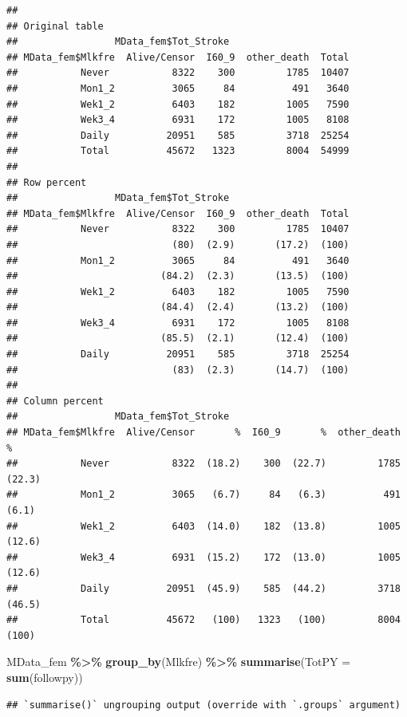 \documentclass[
]{article}
\newenvironment{Shaded}{\begin{snugshade}}{\end{snugshade}}
\newcommand{\DataTypeTok}[1]{\textcolor[rgb]{0.13,0.29,0.53}{#1}}
\newcommand{\KeywordTok}[1]{\textcolor[rgb]{0.13,0.29,0.53}{\textbf{#1}}}
\newcommand{\NormalTok}[1]{#1}
\newcommand{\OperatorTok}[1]{\textcolor[rgb]{0.81,0.36,0.00}{\textbf{#1}}}
\newcommand{\StringTok}[1]{\textcolor[rgb]{0.31,0.60,0.02}{#1}}
\begin{document}
\begin{verbatim}
## 
## Original table 
##                 MData_fem$Tot_Stroke
## MData_fem$Mlkfre  Alive/Censor  I60_9  other_death  Total
##           Never           8322    300         1785  10407
##           Mon1_2          3065     84          491   3640
##           Wek1_2          6403    182         1005   7590
##           Wek3_4          6931    172         1005   8108
##           Daily          20951    585         3718  25254
##           Total          45672   1323         8004  54999
## 
## Row percent 
##                 MData_fem$Tot_Stroke
## MData_fem$Mlkfre  Alive/Censor  I60_9  other_death  Total
##           Never           8322    300         1785  10407
##                           (80)  (2.9)       (17.2)  (100)
##           Mon1_2          3065     84          491   3640
##                         (84.2)  (2.3)       (13.5)  (100)
##           Wek1_2          6403    182         1005   7590
##                         (84.4)  (2.4)       (13.2)  (100)
##           Wek3_4          6931    172         1005   8108
##                         (85.5)  (2.1)       (12.4)  (100)
##           Daily          20951    585         3718  25254
##                           (83)  (2.3)       (14.7)  (100)
## 
## Column percent 
##                 MData_fem$Tot_Stroke
## MData_fem$Mlkfre  Alive/Censor       %  I60_9       %  other_death       %
##           Never           8322  (18.2)    300  (22.7)         1785  (22.3)
##           Mon1_2          3065   (6.7)     84   (6.3)          491   (6.1)
##           Wek1_2          6403  (14.0)    182  (13.8)         1005  (12.6)
##           Wek3_4          6931  (15.2)    172  (13.0)         1005  (12.6)
##           Daily          20951  (45.9)    585  (44.2)         3718  (46.5)
##           Total          45672   (100)   1323   (100)         8004   (100)
\end{verbatim}

\begin{Shaded}
\begin{Highlighting}[]
\NormalTok{MData\_fem }\OperatorTok{\%\textgreater{}\%}\StringTok{ }
\StringTok{  }\KeywordTok{group\_by}\NormalTok{(Mlkfre) }\OperatorTok{\%\textgreater{}\%}\StringTok{ }
\StringTok{  }\KeywordTok{summarise}\NormalTok{(}\DataTypeTok{TotPY =} \KeywordTok{sum}\NormalTok{(followpy))}
\end{Highlighting}
\end{Shaded}

\begin{verbatim}
## `summarise()` ungrouping output (override with `.groups` argument)
\end{verbatim}
\end{document}
